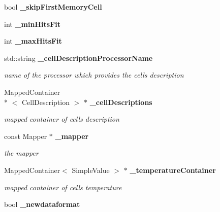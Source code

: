 \begin{DoxyCompactItemize}
\item 
bool {\bfseries \-\_\-skip\-First\-Memory\-Cell}\label{classCALICE_1_1Ahc2TimeCalibrator_aa4d1078711558d163eeb66822d8dd94a}

\item 
int {\bfseries \-\_\-min\-Hits\-Fit}\label{classCALICE_1_1Ahc2TimeCalibrator_a79c2ba9abf8dea2d2a8c7d197dde52c2}

\item 
int {\bfseries \-\_\-max\-Hits\-Fit}\label{classCALICE_1_1Ahc2TimeCalibrator_a866c3efc071b29bcdf8a3d4e12539cc9}

\item 
std\-::string {\bf \-\_\-cell\-Description\-Processor\-Name}\label{classCALICE_1_1Ahc2TimeCalibrator_a36014aff492d28ca737829e1158c9a4b}

\begin{DoxyCompactList}\small\item\em name of the processor which provides the cells description \end{DoxyCompactList}\item 
Mapped\-Container\\*
$<$ Cell\-Description $>$ $\ast$ {\bf \-\_\-cell\-Descriptions}\label{classCALICE_1_1Ahc2TimeCalibrator_abe7c15147b77f585c769a7e1dc017af2}

\begin{DoxyCompactList}\small\item\em mapped container of cells description \end{DoxyCompactList}\item 
const Mapper $\ast$ {\bf \-\_\-mapper}\label{classCALICE_1_1Ahc2TimeCalibrator_a64c2d4119029e9ce8a77047b7b545c6c}

\begin{DoxyCompactList}\small\item\em the mapper \end{DoxyCompactList}\item 
Mapped\-Container$<$ Simple\-Value $>$ $\ast$ {\bf \-\_\-temperature\-Container}\label{classCALICE_1_1Ahc2TimeCalibrator_ade953481012d4286540e924df6e50165}

\begin{DoxyCompactList}\small\item\em mapped container of cells temperature \end{DoxyCompactList}\item 
bool {\bf \-\_\-newdataformat}\label{classCALICE_1_1Ahc2TimeCalibrator_ade5aaf5f3727eb0ee1e1d9dd1c4d484d}


\end{DoxyCompactItemize}
